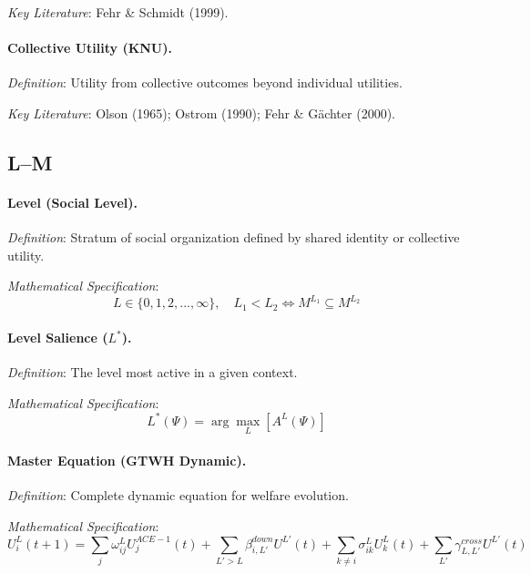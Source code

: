 \textit{Key Literature}: Fehr \& Schmidt (1999).

\medskip

\paragraph{Collective Utility (KNU).}
\textit{Definition}: Utility from collective outcomes beyond individual utilities.

\textit{Key Literature}: Olson (1965); Ostrom (1990); Fehr \& Gächter (2000).

\subsection*{L--M}

\paragraph{Level (Social Level).}
\textit{Definition}: Stratum of social organization defined by shared identity 
or collective utility.

\textit{Mathematical Specification}:
\begin{equation}
L \in \{0, 1, 2, ..., \infty\}, \quad L_1 < L_2 \iff M^{L_1} \subseteq M^{L_2}
\end{equation}

\medskip

\paragraph{Level Salience ($L^*$).}
\textit{Definition}: The level most active in a given context.

\textit{Mathematical Specification}:
\begin{equation}
L^*(\Psi) = \arg\max_L [A^L(\Psi)]
\end{equation}

\medskip

\paragraph{Master Equation (GTWH Dynamic).}
\textit{Definition}: Complete dynamic equation for welfare evolution.

\textit{Mathematical Specification}:
\begin{equation}
\boxed{
U^L_i(t+1) = \sum_{j} \omega^L_{ij} U^{ACE-1}_j(t) + 
\sum_{L'>L} \beta^{down}_{i,L'} U^{L'}(t) + 
\sum_{k \neq i} \sigma^L_{ik} U^L_k(t) + 
\sum_{L'} \gamma^{cross}_{L,L'} U^{L'}(t)
}
\end{equation}


